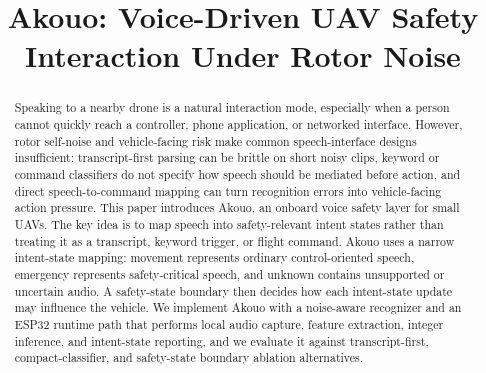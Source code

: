\documentclass[sigconf,anonymous]{acmart}
\newcommand{\sys}{Akouo}
\begin{document}
\title{\sys: Voice-Driven UAV Safety Interaction Under Rotor Noise}

\begin{abstract}
Speaking to a nearby drone is a natural interaction mode, especially when a person cannot quickly reach a controller, phone application, or networked interface. However, rotor self-noise and vehicle-facing risk make common speech-interface designs insufficient: transcript-first parsing can be brittle on short noisy clips, keyword or command classifiers do not specify how speech should be mediated before action, and direct speech-to-command mapping can turn recognition errors into vehicle-facing action pressure. This paper introduces \sys{}, an onboard voice safety layer for small UAVs. The key idea is to map speech into safety-relevant intent states rather than treating it as a transcript, keyword trigger, or flight command. \sys{} uses a narrow intent-state mapping: movement represents ordinary control-oriented speech, emergency represents safety-critical speech, and unknown contains unsupported or uncertain audio. A safety-state boundary then decides how each intent-state update may influence the vehicle. We implement \sys{} with a noise-aware recognizer and an ESP32 runtime path that performs local audio capture, feature extraction, integer inference, and intent-state reporting, and we evaluate it against transcript-first, compact-classifier, and safety-state boundary ablation alternatives.
\end{abstract}

\maketitle












\end{document}

